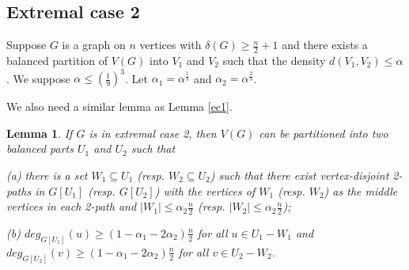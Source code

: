 \documentclass[11pt]{article}
\newtheorem{lemma}{Lemma}
\begin{document}
\subsection{Extremal case 2}
Suppose $G$ is a graph on $n$ vertices with $\delta (G)\geq \frac{n}{2}+1$ and there exists a balanced partition of $V(G)$ into $V_1$ and $V_2$ such that the density $d(V_1,V_2)\leq \alpha$. We suppose $\alpha \leq (\frac{1}{9})^3$. Let $\alpha_1=\alpha ^{\frac{1}{3}}$ and $\alpha_2=\alpha ^{\frac{2}{3}}$.

We also need a similar lemma as Lemma \ref{ec1}.

\begin{lemma}\label{ec2}
If $G$ is in extremal case 2, then $V(G)$ can be partitioned into two balanced parts $U_1$ and $U_2$ such that

(a) there is a set $W_1\subseteq U_1$ (resp. $W_2\subseteq U_2$) such that there exist vertex-disjoint 2-paths in $G[U_1]$ (resp. $G[U_2]$) with the vertices of $W_1$ (resp. $W_2$) as the middle vertices in each 2-path and $|W_1|\leq \alpha_2\frac{n}{2}$ (resp. $|W_2|\leq \alpha_2\frac{n}{2}$);

(b) $deg_{G[U_1]}(u)\geq (1-\alpha_1-2\alpha_2)\frac{n}{2}$ for all $u\in U_1-W_1$ and $deg_{G[U_2]}(v)\geq (1-\alpha_1-2\alpha_2)\frac{n}{2}$ for all $v\in U_2-W_2$.
\end{lemma}
\end{document}
